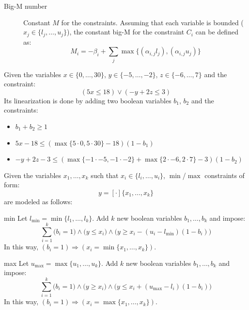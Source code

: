 \begin{description}
\begin{description}
                \begin{description}
                    \item[Big-M number]
                        Constant $M$ for the constraints.
                        Assuming that each variable is bounded ($x_j \in \{l_j, \dots, u_j\}$),
                        the constant big-M for the constraint $C_i$ can be defined as:
                        \[ M_i = -\beta_i + \sum_{j} \max \{ (\alpha_{i,j} l_j), (\alpha_{i,j} u_j) \} \]
                \end{description}

                \begin{example}
                    Given the variables $x \in \{0, \dots, 30\}$, $y \in \{ -5, \dots, -2 \}$, $z \in \{ -6, \dots, 7 \}$ and the constraint:
                    \[ (5x \leq 18) \vee (-y +2z \leq 3) \]
                    Its linearization is done by adding two boolean variables $b_1$, $b_2$ and the constraints:
                    \begin{itemize}
                        \item $b_1 + b_2 \geq 1$
                        \item $5x - 18 \leq (\max\{ 5 \cdot 0, 5 \cdot 30 \} - 18)(1 - b_1)$
                        \item $-y + 2z - 3 \leq (\max\{ -1 \cdot -5, -1 \cdot -2 \} + \max\{ 2 \cdot -6, 2 \cdot 7 \} - 3)(1 - b_2)$
                    \end{itemize}
                \end{example}
        \end{description}

    \item[Min/max constraints] 
        Given the variables $x_1, \dots, x_k$ such that $x_i \in \{ l_i, \dots, u_i \}$,
        $\min$/$\max$ constraints of form:
        \[ y = [\cdot] \{ x_1, \dots, x_k \} \] 
        are modeled as follows:
        \begin{descriptionlist}
            \item[min] 
                Let $l_{\min} = \min\{ l_1, \dots, l_k \}$.
                Add $k$ new boolean variables $b_1, \dots, b_k$ and impose:
                \[ \sum_{i=1}^{k} \big( b_i = 1 \big) \land \big( y \leq x_i \big) \land \big( y \geq x_i - (u_i - l_{\min})(1 - b_i) \big) \]
                In this way, $(b_i = 1) \Rightarrow (x_i = \min\{ x_1, \dots, x_k \})$.

            \item[max] 
                Let $u_{\max} = \max\{ u_1, \dots, u_k \}$.
                Add $k$ new boolean variables $b_1, \dots, b_k$ and impose:
                \[ \sum_{i=1}^{k} \big( b_i = 1 \big) \land \big( y \geq x_i \big) \land \big( y \leq x_i + (u_{\max}-l_i)(1 - b_i) \big) \]
                In this way, $(b_i = 1) \Rightarrow (x_i = \max\{ x_1, \dots, x_k \})$.
        \end{descriptionlist}


\end{description}
